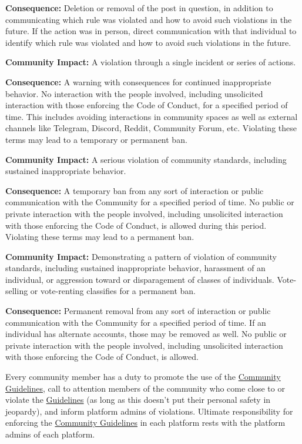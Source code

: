 \textbf{Consequence:} Deletion or removal of the post in question, in addition to communicating which rule was violated and how to avoid such violations in the future. If the action was in person, direct communication with that individual to identify which rule was violated and how to avoid such violations in the future.

\textbf{Community Impact:} A violation through a single incident or series of actions.

\textbf{Consequence:} A warning with consequences for continued inappropriate behavior. 
No interaction with the people involved, including unsolicited interaction with those enforcing the Code of Conduct, for a specified period of time. 
This includes avoiding interactions in community spaces as well as external channels like Telegram, Discord, Reddit, Community Forum, etc. 
Violating these terms may lead to a temporary or permanent ban.

\textbf{Community Impact:} A serious violation of community standards, including sustained inappropriate behavior.

\textbf{Consequence:} A temporary ban from any sort of interaction or public communication with the Community for a specified period of time. 
No public or private interaction with the people involved, including unsolicited interaction with those enforcing the Code of Conduct, is allowed during this period. 
Violating these terms may lead to a permanent ban.

\textbf{Community Impact:} Demonstrating a pattern of violation of community standards, including sustained inappropriate behavior, harassment of an individual, or aggression toward or disparagement of classes of individuals. Vote-selling or vote-renting classifies for a permanent ban.

\textbf{Consequence:} Permanent removal from any sort of interaction or public communication with the Community for a specified period of time. 
If an individual has alternate accounts, those may be removed as well. 
No public or private interaction with the people involved, including unsolicited interaction with those enforcing the Code of Conduct, is allowed.

Every community member has a duty to promote the use of the \hyperref[chap:CommunityGuidelines]{Community Guidelines}, call to attention members of the community who come close to or violate the \hyperref[chap:CommunityGuidelines]{Guidelines} (as long as this doesn’t put their personal safety in jeopardy), and inform platform admins of violations.
Ultimate responsibility for enforcing the \hyperref[chap:CommunityGuidelines]{Community Guidelines} in each platform rests with the platform admins of each platform.


